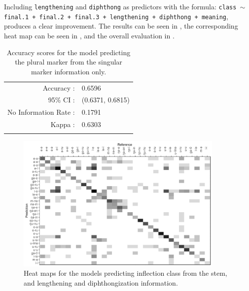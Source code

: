 Including \texttt{lengthening} and \texttt{diphthong} as predictors with the formula: \texttt{class $\sim$ final.1 + final.2 + final.3 + lengthening + diphthong + meaning}, produces a clear improvement. The results can be seen in , the corresponding heat map can be seen in , and the overall evaluation in .

\begin{table}
  \centering
  \begin{tabular}{rl}
    \lsptoprule
    \multicolumn{2}{c}{Overall Statistics}  \\
    \midrule
    Accuracy :& 0.6596\\
    95\% CI :& (0.6371, 0.6815)\\
    No Information Rate :& 0.1791\\
    Kappa :& 0.6303\\
    \lspbottomrule
  \end{tabular}
  \caption{Accuracy scores for the model predicting the plural marker from the singular marker information only.}\label{tab:class-marker-dplengthstem}
\end{table}

\begin{figure}
  \centering
  \includegraphics[width=0.9\textwidth]{./figures/kasem/p-class-sg-cm-2.pdf}
  \caption{Heat maps for the models predicting inflection class from the stem, and lengthening and diphthongization information.}\label{fig:cm-class-sg-2}
\end{figure}


